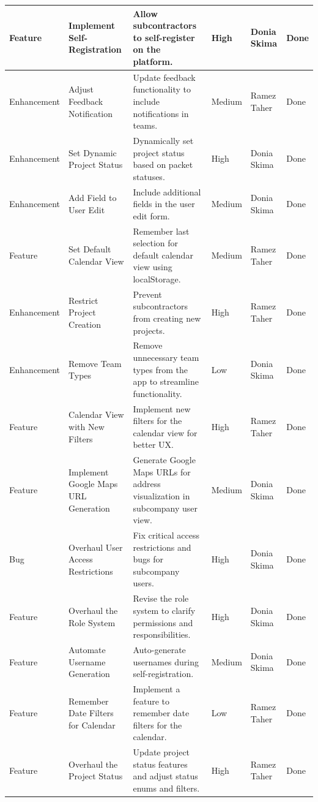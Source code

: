 \begin{longtable}{|p{2.5cm}|p{2cm}|p{2.75cm}|p{1.75cm}|p{1.75cm}|p{1.25cm}|}
    Feature & Implement Self-Registration & Allow subcontractors to self-register on the platform. & High & Donia Skima & Done \\    \hline
    Enhancement & Adjust Feedback Notification & Update feedback functionality to include notifications in teams. & Medium & Ramez Taher & Done \\
    \hline
    Enhancement & Set Dynamic Project Status & Dynamically set project status based on packet statuses. & High & Donia Skima & Done \\
    \hline
    Enhancement & Add Field to User Edit & Include additional fields in the user edit form. & Medium & Donia Skima & Done \\
    \hline
    Feature & Set Default Calendar View & Remember last selection for default calendar view using localStorage. & Medium & Ramez Taher & Done \\
    \hline
    Enhancement & Restrict Project Creation & Prevent subcontractors from creating new projects. & High & Ramez Taher & Done \\
    \hline
    Enhancement & Remove Team Types & Remove unnecessary team types from the app to streamline functionality. & Low & Donia Skima & Done \\
    \hline
    Feature & Calendar View with New Filters & Implement new filters for the calendar view for better UX. & High & Ramez Taher & Done \\
    \hline
    Feature & Implement Google Maps URL Generation & Generate Google Maps URLs for address visualization in subcompany user view. & Medium & Donia Skima & Done \\
    \hline
    Bug & Overhaul User Access Restrictions & Fix critical access restrictions and bugs for subcompany users. & High & Donia Skima & Done \\
    \hline
    Feature & Overhaul the Role System & Revise the role system to clarify permissions and responsibilities. & High & Donia Skima & Done \\
    \hline
    Feature & Automate Username Generation & Auto-generate usernames during self-registration. & Medium & Donia Skima & Done \\
    \hline
    Feature & Remember Date Filters for Calendar & Implement a feature to remember date filters for the calendar. & Low & Ramez Taher & Done \\
    \hline
    Feature & Overhaul the Project Status & Update project status features and adjust status enums and filters. & High & Ramez Taher & Done \\

\end{longtable}
